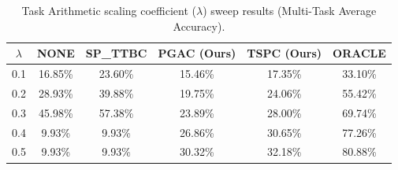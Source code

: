 \documentclass{article}
\theoremstyle{plain}
\theoremstyle{definition}
\theoremstyle{remark}
\begin{document}
\begin{table}[h]
\caption{Task Arithmetic scaling coefficient ($\lambda$) sweep results (Multi-Task Average Accuracy).}
\label{tab:scaling_sweep}
\vskip 0.15in
\begin{center}
\begin{small}
\begin{sc}
\begin{tabular}{cccccc}
\toprule
$\lambda$ & NONE & SP\_TTBC & PGAC (Ours) & TSPC (Ours) & ORACLE \\
\midrule
0.1 & 16.85\% & 23.60\% & 15.46\% & 17.35\% & 33.10\% \\
0.2 & 28.93\% & 39.88\% & 19.75\% & 24.06\% & 55.42\% \\
0.3 & 45.98\% & 57.38\% & 23.89\% & 28.00\% & 69.74\% \\
0.4 & 9.93\% & 9.93\%  & 26.86\% & 30.65\% & 77.26\% \\
0.5 & 9.93\% & 9.93\%  & 30.32\% & 32.18\% & 80.88\% \\
\bottomrule
\end{tabular}
\end{sc}
\end{small}
\end{center}
\vskip -0.1in
\end{table}
\end{document}
